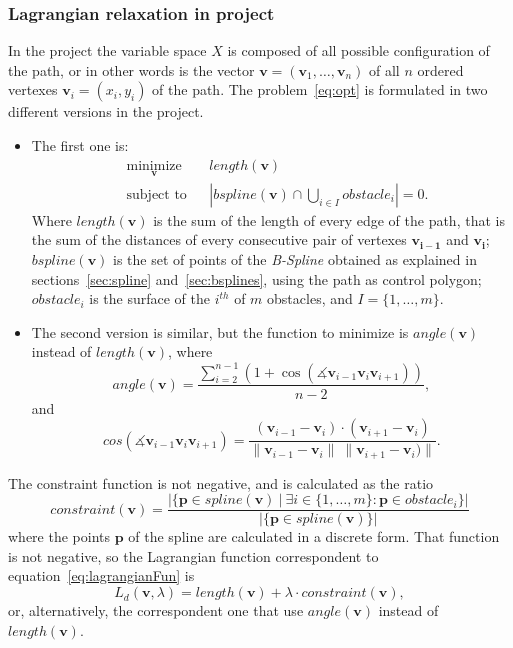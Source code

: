 \documentclass[a4paper]{article}
\begin{document}
\subsubsection{Lagrangian relaxation in project}
In the project the variable space $X$ is composed of all possible
configuration of the path, or in other words is the vector
$\mathbf{v}=(\mathbf{v}_1,\dots,\mathbf{v}_n)$ of all $n$ ordered
vertexes $\mathbf{v}_i=(x_i,y_i)$ of the
path. The problem~\eqref{eq:opt} is formulated in two different
versions in the project.
\begin{itemize}
\item The first one is:
  \begin{equation*}
    \begin{aligned}
      & \underset{\mathbf{v}}{\text{minimize}}
      & & length(\mathbf{v}) \\
      & \text{subject to}
      & & \left|bspline(\mathbf{v})\cap \bigcup_{i\in I}obstacle_i\right| = 0.
    \end{aligned}
  \end{equation*}
  Where $length(\mathbf{v})$ is the sum of the length of every edge of the
  path, that is the sum of the distances of every consecutive pair of
  vertexes $\mathbf{v_{i-1}}$ and $\mathbf{v_i}$; $bspline(\mathbf{v})$
  is the set of points of the \emph{B-Spline} obtained as explained in
  sections~\ref{sec:spline} and~\ref{sec:bsplines}, using the path as
  control polygon;
  $obstacle_i$ is the surface of the $i^{th}$ of $m$ obstacles, and
  $I=\{1,\dots,m\}$.
\item The second version is similar, but the function to minimize is
  $angle(\mathbf{v})$ instead of $length(\mathbf{v})$, where
  \begin{equation*}
    angle(\mathbf{v}) = \frac{\sum_{i=2}^{n-1}(1+\cos(\measuredangle \mathbf{v}_{i-1}\mathbf{v}_{i}\mathbf{v}_{i+1}))}{n-2},
  \end{equation*}
  and
  \begin{equation*}
    cos(\measuredangle
    \mathbf{v}_{i-1}\mathbf{v}_{i}\mathbf{v}_{i+1})=\frac{(\mathbf{v}_{i-1}-\mathbf{v}_{i})\cdot
      (\mathbf{v}_{i+1}-\mathbf{v}_{i})}{\|\mathbf{v}_{i-1}-\mathbf{v}_{i}\|\
      \|\mathbf{v}_{i+1}-\mathbf{v}_{i})\|}.
  \end{equation*}
\end{itemize}

The constraint function is not negative, and is calculated as the
ratio
\begin{equation*}
constraint(\mathbf{v}) = \frac{|\{\mathbf{p} \in spline(\mathbf{v})\ |\ \exists i\in\{1,\dots,m\}
  : \mathbf{p}\in obstacle_i \}|}{|\{\mathbf{p} \in spline(\mathbf{v})\}|}
\end{equation*}
where the points $\mathbf{p}$ of the spline are calculated in a discrete form. That
function is not negative, so the Lagrangian function correspondent to
equation~\eqref{eq:lagrangianFun} is
\begin{equation}\label{eq:lagrangianFunProj}
    L_d(\mathbf{v},\lambda)=length(\mathbf{v})+\lambda\cdot constraint(\mathbf{v}),
\end{equation}
or, alternatively, the correspondent one that use $angle(\mathbf{v})$ instead of $length(\mathbf{v})$.
\end{document}
